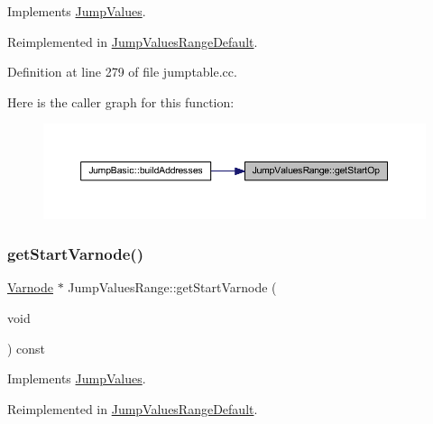 Implements \mbox{\hyperlink{class_jump_values_a1b1beeebd8a33f7710f30c495f130993}{Jump\+Values}}.



Reimplemented in \mbox{\hyperlink{class_jump_values_range_default_a57e9f0efc13c6864527cc0b1aa2017a7}{Jump\+Values\+Range\+Default}}.



Definition at line 279 of file jumptable.\+cc.

Here is the caller graph for this function\+:
\nopagebreak
\begin{figure}[H]
\begin{center}
\leavevmode
\includegraphics[width=350pt]{class_jump_values_range_a22ef1c5380849124e596224bac24413e_icgraph}
\end{center}
\end{figure}
\mbox{\label{class_jump_values_range_a1652b9c2b1e6cedf3d80452cfe5aa37f}} 
\subsubsection{\texorpdfstring{getStartVarnode()}{getStartVarnode()}}
{\footnotesize\ttfamily \mbox{\hyperlink{class_varnode}{Varnode}} $\ast$ Jump\+Values\+Range\+::get\+Start\+Varnode (\begin{DoxyParamCaption}\item[{void}]{ }\end{DoxyParamCaption}) const\hspace{0.3cm}{\ttfamily [virtual]}}



Implements \mbox{\hyperlink{class_jump_values_a6505dbaeb1e61b7d60aff3e9f1947941}{Jump\+Values}}.



Reimplemented in \mbox{\hyperlink{class_jump_values_range_default_a65b5aaf23fe237b5feb699050f75da54}{Jump\+Values\+Range\+Default}}.



